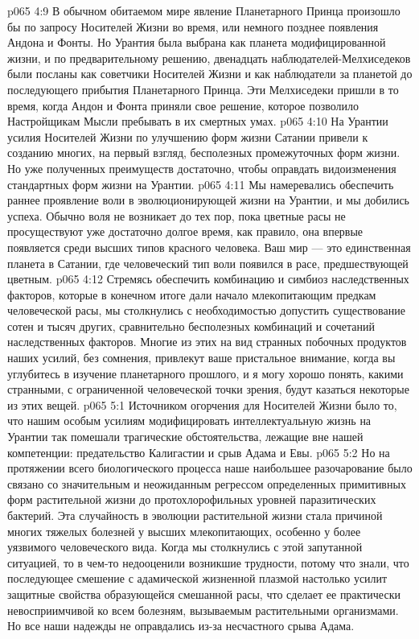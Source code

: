 \vs p065 4:9 В обычном обитаемом мире явление Планетарного Принца произошло бы по запросу Носителей Жизни во время, или немного позднее появления Андона и Фонты. Но Урантия была выбрана как планета модифицированной жизни, и по предварительному решению, двенадцать наблюдателей\hyp{}Мелхиседеков были посланы как советчики Носителей Жизни и как наблюдатели за планетой до последующего прибытия Планетарного Принца. Эти Мелхиседеки пришли в то время, когда Андон и Фонта приняли свое решение, которое позволило Настройщикам Мысли пребывать в их смертных умах.
\vs p065 4:10 \pc На Урантии усилия Носителей Жизни по улучшению форм жизни Сатании привели к созданию многих, на первый взгляд, бесполезных промежуточных форм жизни. Но уже полученных преимуществ достаточно, чтобы оправдать видоизменения стандартных форм жизни на Урантии.
\vs p065 4:11 Мы намеревались обеспечить раннее проявление воли в эволюционирующей жизни на Урантии, и мы добились успеха. Обычно воля не возникает до тех пор, пока цветные расы не просуществуют уже достаточно долгое время, как правило, она впервые появляется среди высших типов красного человека. Ваш мир --- это единственная планета в Сатании, где человеческий тип воли появился в расе, предшествующей цветным.
\vs p065 4:12 Стремясь обеспечить комбинацию и симбиоз наследственных факторов, которые в конечном итоге дали начало млекопитающим предкам человеческой расы, мы столкнулись с необходимостью допустить существование сотен и тысяч других, сравнительно бесполезных комбинаций и сочетаний наследственных факторов. Многие из этих на вид странных побочных продуктов наших усилий, без сомнения, привлекут ваше пристальное внимание, когда вы углубитесь в изучение планетарного прошлого, и я могу хорошо понять, какими странными, с ограниченной человеческой точки зрения, будут казаться некоторые из этих вещей.
\vs p065 5:1 Источником огорчения для Носителей Жизни было то, что нашим особым усилиям модифицировать интеллектуальную жизнь на Урантии так помешали трагические обстоятельства, лежащие вне нашей компетенции: предательство Калигастии и срыв Адама и Евы.
\vs p065 5:2 Но на протяжении всего биологического процесса наше наибольшее разочарование было связано со значительным и неожиданным регрессом определенных примитивных форм растительной жизни до протохлорофильных уровней паразитических бактерий. Эта случайность в эволюции растительной жизни стала причиной многих тяжелых болезней у высших млекопитающих, особенно у более уязвимого человеческого вида. Когда мы столкнулись с этой запутанной ситуацией, то в чем\hyp{}то недооценили возникшие трудности, потому что знали, что последующее смешение с адамической жизненной плазмой настолько усилит защитные свойства образующейся смешанной расы, что сделает ее практически невосприимчивой ко всем болезням, вызываемым растительными организмами. Но все наши надежды не оправдались из\hyp{}за несчастного срыва Адама.
